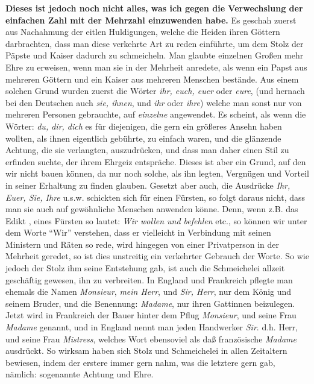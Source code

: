 \textbf{Dieses ist jedoch noch nicht alles, was ich gegen die Verwechslung der
einfachen Zahl mit der Mehrzahl einzuwenden habe.} Es geschah zuerst aus
Nachahmung der eitlen Huldigungen, welche die Heiden
ihren Göttern darbrachten,
dass man diese verkehrte Art zu reden einführte, um dem Stolz der
Päpste und
Kaiser dadurch zu schmeicheln.
Man glaubte einzelnen Großen mehr Ehre zu
erweisen, wenn man sie in der Mehrheit anredete, als wenn ein Papst aus mehreren
Göttern und ein Kaiser aus mehreren Menschen bestände. Aus einem solchen Grund
wurden zuerst die Wörter \textit{ihr, euch, euer} oder \textit{eure}, (und
hernach bei
den Deutschen auch \textit{sie, ihnen}, und \textit{ihr} oder \textit{ihre})
welche man sonst
nur von mehreren Personen gebrauchte, auf \textit{einzelne} angewendet. Es
scheint,
als wenn die Wörter: \textit{du, dir, dich} es für diejenigen, die gern ein
größeres
Ansehn haben wollten, als ihnen eigentlich gebührte, zu einfach waren, und die
glänzende Achtung, die sie verlangten, auszudrücken, und dass man daher einen
Stil zu erfinden suchte, der ihrem Ehrgeiz entspräche. Dieses ist aber ein
Grund, auf den wir nicht bauen können, da nur noch solche, als ihn legten,
Vergnügen und Vorteil in seiner Erhaltung zu finden glauben. Gesetzt aber auch,
die Ausdrücke \textit{Ihr, Euer, Sie, Ihre} u.s.w. schickten sich für einen
Fürsten,
so folgt daraus nicht, dass man sie auch auf gewöhnliche Menschen anwenden könne.
Denn, wenn z.B. das Edikt ,
eines Fürsten so lautet: \textit{Wir wollen und
befehlen}
etc., so können wir unter dem Worte "`Wir"' verstehen, dass er vielleicht in
Verbindung mit seinen Ministern und Räten so rede, wird hingegen von einer
Privatperson in der Mehrheit geredet, so ist dies unstreitig ein verkehrter
Gebrauch der Worte. So wie jedoch der Stolz ihm seine Entstehung gab, ist auch
die Schmeichelei allzeit geschäftig gewesen, ihn zu verbreiten. In England und
Frankreich pflegte man ehemals die Namen \textit{Monsieur}, \textit{mein
Herr}, und
\textit{Sir, Herr}, nur dem König und seinem Bruder, und die Benennung:
\textit{Madame},
nur ihren Gattinnen beizulegen. Jetzt wird in Frankreich der
Bauer hinter dem
Pflug \textit{Monsieur}, und seine Frau \textit{Madame} genannt, und in England
nennt man
jeden Handwerker \textit{Sir}. d.h. Herr, und seine
Frau \textit{Mistress}, welches Wort
ebensoviel als daß französische \textit{Madame} ausdrückt. So wirksam haben sich
Stolz und
Schmeichelei in allen Zeitaltern bewiesen, indem der erstere immer gern nahm,
was die letztere gern gab, nämlich: sogenannte Achtung und Ehre.

